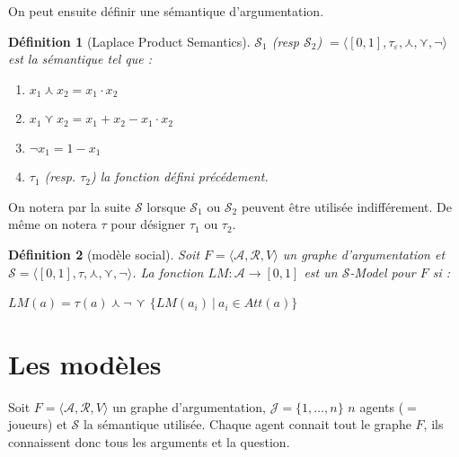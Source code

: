 \documentclass[12pt]{article}
\theoremstyle{defi}
\newtheorem{definition}{Définition}[section]
\theoremstyle{not}
\theoremstyle{prob}
\begin{document}
\color{black}
      On peut ensuite définir une sémantique d'argumentation.
      \begin{definition}[Laplace Product Semantics]
        $\mathcal{S}_1$ (resp $\mathcal{S}_2$) $= \langle [0, 1], \tau_\varepsilon, \curlywedge, \curlyvee, \neg  \rangle$ est la sémantique tel que :
        \begin{enumerate}
          \item $x_1 \curlywedge x_2 = x_1 \cdot x_2$
          \item $x_1 \curlyvee x_2 = x_1 + x_2 - x_1 \cdot x_2$
          \item $\neg x_1 = 1 - x_1$
          \item $\tau_1$ (resp. $\tau_2$) la fonction défini précédement.
        \end{enumerate}
      \end{definition}

      On notera par la suite $\mathcal{S}$ lorsque $\mathcal{S}_1$ ou $\mathcal{S}_2$ peuvent être utilisée indifférement.
      De même on notera $\tau$ pour désigner $\tau_1$ ou $\tau_2$.

      \begin{definition}[modèle social]
        Soit $F= \langle \mathcal{A}, \mathcal{R}, V \rangle$ un graphe d'argumentation et $\mathcal{S} = \langle [0, 1], \tau, \curlywedge, \curlyvee, \neg  \rangle$.
        La fonction $LM : \mathcal{A} \rightarrow [0, 1]$ est un $\mathcal{S}$-Model pour $F$ si :

        $LM(a) = \tau(a) \curlywedge \neg$ {\Large $\curlyvee$} $\{LM(a_i)\ |\ a_i \in Att(a)\}$
      \end{definition}

  \section{Les modèles}
    Soit $F = \langle \mathcal{A}, \mathcal{R}, V \rangle$ un graphe d'argumentation, $\mathcal{J} = \{1, \ldots, n\}$ $n$ agents ($=$ joueurs) et $\mathcal{S}$ la sémantique utilisée.
    Chaque agent connait tout le graphe $F$, ils connaissent donc tous les arguments et la question.
\end{document}
